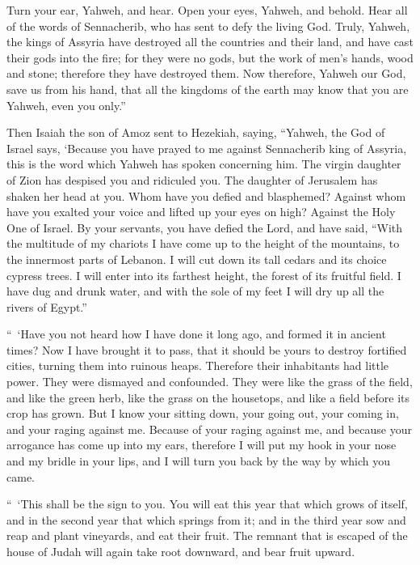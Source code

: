 {Turn your ear, Yahweh, and hear. Open your eyes, Yahweh, and behold. Hear all of the words of Sennacherib, who has sent to defy the living God.
Truly, Yahweh, the kings of Assyria have destroyed all the countries and their land,
and have cast their gods into the fire; for they were no gods, but the work of men’s hands, wood and stone; therefore they have destroyed them.
Now therefore, Yahweh our God, save us from his hand, that all the kingdoms of the earth may know that you are Yahweh, even you only.”
\par }{\PP {}Then Isaiah the son of Amoz sent to Hezekiah, saying, “Yahweh, the God of Israel says, ‘Because you have prayed to me against Sennacherib king of Assyria,
this is the word which Yahweh has spoken concerning him. The virgin daughter of Zion has despised you and ridiculed you. The daughter of Jerusalem has shaken her head at you.
Whom have you defied and blasphemed? Against whom have you exalted your voice and lifted up your eyes on high? Against the Holy One of Israel.
By your servants, you have defied the Lord, and have said, “With the multitude of my chariots I have come up to the height of the mountains, to the innermost parts of Lebanon. I will cut down its tall cedars and its choice cypress trees. I will enter into its farthest height, the forest of its fruitful field.
I have dug and drunk water, and with the sole of my feet I will dry up all the rivers of Egypt.”
\par }{\PP {}“ ‘Have you not heard how I have done it long ago, and formed it in ancient times? Now I have brought it to pass, that it should be yours to destroy fortified cities, turning them into ruinous heaps.
Therefore their inhabitants had little power. They were dismayed and confounded. They were like the grass of the field, and like the green herb, like the grass on the housetops, and like a field before its crop has grown.
But I know your sitting down, your going out, your coming in, and your raging against me.
Because of your raging against me, and because your arrogance has come up into my ears, therefore I will put my hook in your nose and my bridle in your lips, and I will turn you back by the way by which you came.
\par }{\PP {}“ ‘This shall be the sign to you. You will eat this year that which grows of itself, and in the second year that which springs from it; and in the third year sow and reap and plant vineyards, and eat their fruit.
The remnant that is escaped of the house of Judah will again take root downward, and bear fruit upward.
}
